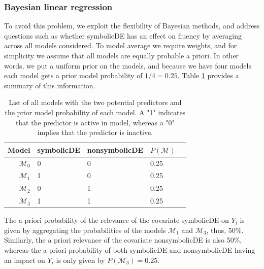 \documentclass[english,,doc,floatsintext]{apa6}
\begin{document}
\hypertarget{bayesian-linear-regression}{%
\subsubsection{Bayesian linear regression}\label{bayesian-linear-regression}}

To avoid this problem, we exploit the flexibility of Bayesian methods, and address questions such as whether symbolicDE has an effect on fluency by averaging across all models considered. To model average we require weights, and for simplicity we assume that all models are equally probable a priori. In other words, we put a uniform prior on the models, and because we have four models each model gets a prior model probability of \(1/4=0.25\). Table \ref{tabLinreg} provides a summary of this information.

\begin{table}
\label{tabLinreg}
\caption{List of all models with the two potential predictors and the prior model probability of each model. A "1" indicates that the predictor is active in model, whereas a "0" implies that the predictor is inactive.}
\begin{center}
\begin{tabular}{rllll}
\hline
Model & symbolicDE & nonsymbolicDE & \( P(\mathcal{M}) \) \\
\hline
\( \mathcal{M}_{0} \) & 0 & 0 & 0.25 \\
\( \mathcal{M}_{1} \) & 1 & 0 & 0.25 \\
\( \mathcal{M}_{2} \) & 0 & 1 & 0.25 \\
\( \mathcal{M}_{3} \) & 1 & 1 & 0.25 \\
\hline
\end{tabular}
\end{center}
\end{table}

The a priori probability of the relevance of the covariate symbolicDE on \(Y_{i}\) is given by aggregating the probabilities of the models \(\mathcal{M}_{1}\) and \(\mathcal{M}_{3}\), thus, 50\%. Similarly, the a priori relevance of the covariate nonsymbolicDE is also 50\%, whereas the a priori probability of both symbolicDE and nonsymbolicDE having an impact on \(Y_{i}\) is only given by \(P(\mathcal{M}_{3}) = 0.25\).
\end{document}
